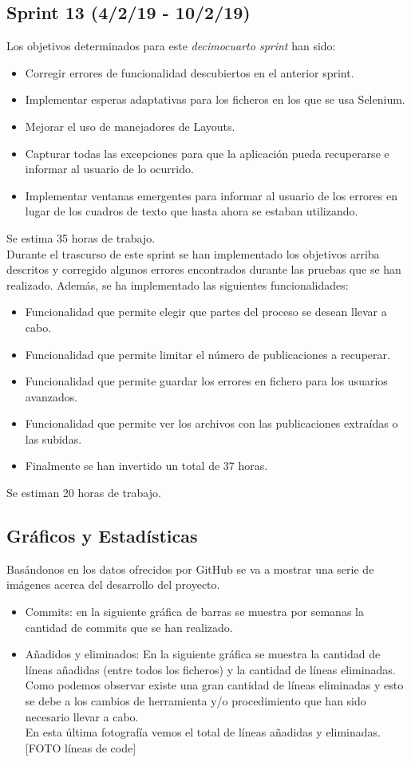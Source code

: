 \subsection{Sprint 13 (4/2/19 - 10/2/19)}
Los objetivos determinados para este \emph{decimocuarto sprint} han sido:
\begin{itemize}
	\item Corregir errores de funcionalidad descubiertos en el anterior sprint.
	\item Implementar esperas adaptativas para los ficheros en los que se usa Selenium.
	\item Mejorar el uso de manejadores de Layouts.
	\item Capturar todas las excepciones para que la aplicación pueda recuperarse e informar al usuario de lo ocurrido.
	\item Implementar ventanas emergentes para informar al usuario de los errores en lugar de los cuadros de texto que hasta ahora se estaban utilizando.
\end{itemize}
Se estima 35 horas de trabajo. \\
Durante el trascurso de este sprint se han implementado los objetivos arriba descritos y corregido algunos errores encontrados durante las pruebas que se han realizado. Además, se ha implementado las siguientes funcionalidades:
\begin{itemize}
	\item Funcionalidad que permite elegir que partes del proceso se desean llevar a cabo.
	\item Funcionalidad que permite limitar el número de publicaciones a recuperar.
	\item Funcionalidad que permite guardar los errores en fichero para los usuarios avanzados.
	\item Funcionalidad que permite ver los archivos con las publicaciones extraídas o las subidas.
	\item Finalmente se han invertido un total de 37 horas.
\end{itemize}
Se estiman 20 horas de trabajo.

\subsection{Gráficos y Estadísticas}
Basándonos en los datos ofrecidos por GitHub se va a mostrar una serie de imágenes acerca del desarrollo del proyecto.
\begin{itemize}
	\item Commits: en la siguiente gráfica de barras se muestra por semanas la cantidad de commits que se han realizado.
	\item Añadidos y eliminados: En la siguiente gráfica se muestra la cantidad de líneas añadidas (entre todos los ficheros) y la cantidad de líneas eliminadas. Como podemos observar existe una gran cantidad de líneas eliminadas y esto se debe a los cambios de herramienta y/o procedimiento que han sido necesario llevar a cabo.\\En esta última fotografía vemos el total de líneas añadidas y eliminadas.
	[FOTO líneas de code]

\end{itemize}

